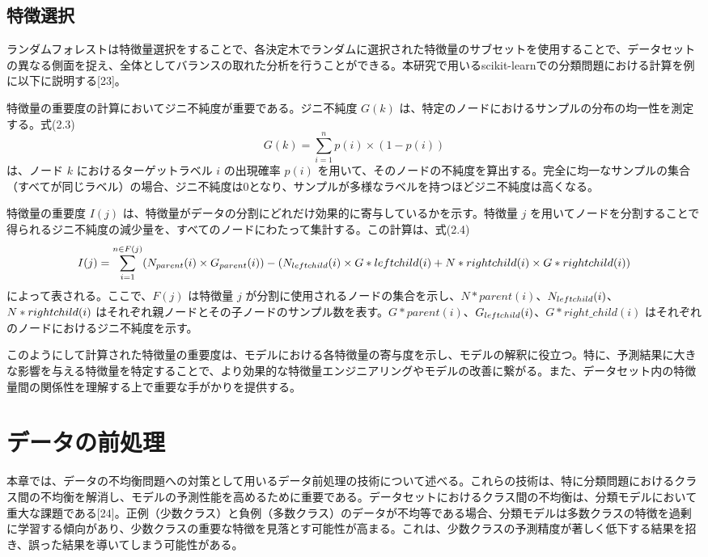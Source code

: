 \documentclass[platex]{suribt}
\begin{document}
\subsection{特徴選択}
ランダムフォレストは特徴量選択をすることで、各決定木でランダムに選択された特徴量のサブセットを使用することで、データセットの異なる側面を捉え、全体としてバランスの取れた分析を行うことができる。本研究で用いるscikit-learnでの分類問題における計算を例に以下に説明する[23]。

特徴量の重要度の計算においてジニ不純度が重要である。ジニ不純度 \( G(k) \) は、特定のノードにおけるサンプルの分布の均一性を測定する。式(2.3)
\begin{equation}
G(k) = \sum_{i=1}^{n} p(i) \times (1-p(i))
\end{equation}
は、ノード \( k \) におけるターゲットラベル \( i \) の出現確率 \( p(i) \) を用いて、そのノードの不純度を算出する。完全に均一なサンプルの集合（すべてが同じラベル）の場合、ジニ不純度は0となり、サンプルが多様なラベルを持つほどジニ不純度は高くなる。

特徴量の重要度 \( I(j) \) は、特徴量がデータの分割にどれだけ効果的に寄与しているかを示す。特徴量 \( j \) を用いてノードを分割することで得られるジニ不純度の減少量を、すべてのノードにわたって集計する。この計算は、式(2.4)
\footnotesize
\begin{equation}
I(j) = \sum_{i=1}^{n \in F(j)} (N_{parent}(i) \times G_{parent}(i)) - (N_{left\*child}(i) \times G*{left\*child}(i) + N*{right\*child}(i) \times G*{right\*child}(i))
\end{equation}
\normalsize
によって表される。ここで、\( F(j) \) は特徴量 \( j \) が分割に使用されるノードの集合を示し、\( N*{parent}(i) \)、\( N_{left\*child}(i) \)、\( N*{right\*child}(i) \) はそれぞれ親ノードとその子ノードのサンプル数を表す。\( G*{parent}(i) \)、\( G_{left\*child}(i) \)、\( G*{right\_child}(i) \) はそれぞれのノードにおけるジニ不純度を示す。

このようにして計算された特徴量の重要度は、モデルにおける各特徴量の寄与度を示し、モデルの解釈に役立つ。特に、予測結果に大きな影響を与える特徴量を特定することで、より効果的な特徴量エンジニアリングやモデルの改善に繋がる。また、データセット内の特徴量間の関係性を理解する上で重要な手がかりを提供する。
\section{データの前処理}
本章では、データの不均衡問題への対策として用いるデータ前処理の技術について述べる。これらの技術は、特に分類問題におけるクラス間の不均衡を解消し、モデルの予測性能を高めるために重要である。データセットにおけるクラス間の不均衡は、分類モデルにおいて重大な課題である[24]。正例（少数クラス）と負例（多数クラス）のデータが不均等である場合、分類モデルは多数クラスの特徴を過剰に学習する傾向があり、少数クラスの重要な特徴を見落とす可能性が高まる。これは、少数クラスの予測精度が著しく低下する結果を招き、誤った結果を導いてしまう可能性がある。
\end{document}
